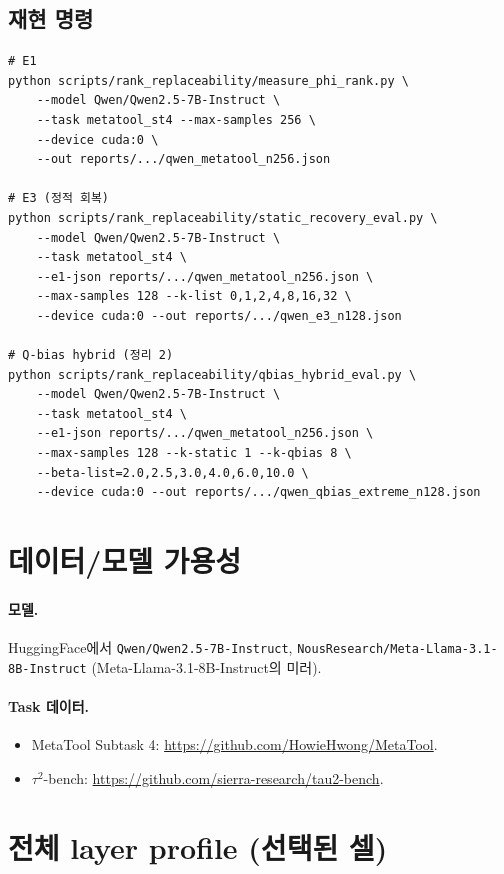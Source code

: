 \documentclass{article}
\theoremstyle{definition}
\begin{document}
\subsection{재현 명령}
\begin{verbatim}
# E1
python scripts/rank_replaceability/measure_phi_rank.py \
    --model Qwen/Qwen2.5-7B-Instruct \
    --task metatool_st4 --max-samples 256 \
    --device cuda:0 \
    --out reports/.../qwen_metatool_n256.json

# E3 (정적 회복)
python scripts/rank_replaceability/static_recovery_eval.py \
    --model Qwen/Qwen2.5-7B-Instruct \
    --task metatool_st4 \
    --e1-json reports/.../qwen_metatool_n256.json \
    --max-samples 128 --k-list 0,1,2,4,8,16,32 \
    --device cuda:0 --out reports/.../qwen_e3_n128.json

# Q-bias hybrid (정리 2)
python scripts/rank_replaceability/qbias_hybrid_eval.py \
    --model Qwen/Qwen2.5-7B-Instruct \
    --task metatool_st4 \
    --e1-json reports/.../qwen_metatool_n256.json \
    --max-samples 128 --k-static 1 --k-qbias 8 \
    --beta-list=2.0,2.5,3.0,4.0,6.0,10.0 \
    --device cuda:0 --out reports/.../qwen_qbias_extreme_n128.json
\end{verbatim}

\section{데이터/모델 가용성}
\label{app:data}

\paragraph{모델.} HuggingFace에서 \texttt{Qwen/Qwen2.5-7B-Instruct}, \texttt{NousResearch/Meta-Llama-3.1-8B-Instruct} (Meta-Llama-3.1-8B-Instruct의 미러).

\paragraph{Task 데이터.}
\begin{itemize}[leftmargin=*]
\item MetaTool Subtask 4: \url{https://github.com/HowieHwong/MetaTool}.
\item $\tau^2$-bench: \url{https://github.com/sierra-research/tau2-bench}.
\end{itemize}

\section{전체 layer profile (선택된 셀)}
\label{app:layer-profile}
\end{document}
